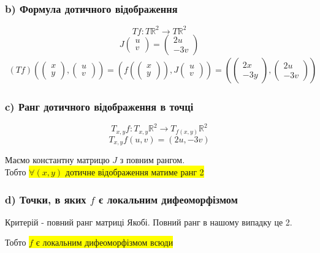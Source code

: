 \documentclass[10pt, a4paper]{article} %
\newcommand{\R}{\mathbb{R}}
\begin{document}
\subsubsection*{b) Формула дотичного відображення}
\[Tf : T\R^2 \to T\R^2\]
\[J\begin{pmatrix}u\\v\end{pmatrix} = \begin{pmatrix}2u\\-3v\end{pmatrix}\]
\begin{align*}
    (Tf)\left(\begin{pmatrix}x\\y\end{pmatrix} , \begin{pmatrix}u\\v\end{pmatrix}\right)
    = \left(f(\begin{pmatrix}x\\y\end{pmatrix}) , J\begin{pmatrix}u\\v\end{pmatrix}\right)
    = \left(\begin{pmatrix}2x\\-3y\end{pmatrix} , \begin{pmatrix}2u\\-3v\end{pmatrix}\right)
\end{align*}

\subsubsection*{c) Ранг дотичного відображення в точці}
\[T_{x,y}f : T_{x,y}\R^2 \to T_{f(x,y)}\R^2\]
\[T_{x,y}f(u,v) = (2u, -3v)\]

Маємо константну матрицю $J$ з повним рангом. \\
Тобто \colorbox{yellow}{$\forall (x,y)$ дотичне відображення матиме ранг 2}

\subsubsection*{d) Точки, в яких $f$ є локальним дифеоморфізмом}
Критерій - повний ранг матриці Якобі.
Повний ранг в нашому випадку це 2.

Тобто \colorbox{yellow}{$f$ є локальним дифеоморфізмом всюди}
\end{document}
